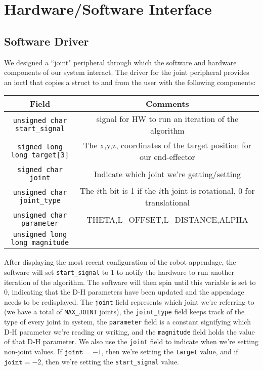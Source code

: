 \section{Hardware/Software Interface}

\subsection{Software Driver}

We designed a ``joint" peripheral through which the software and 
hardware components of our system interact. 
The driver for the joint peripheral provides an ioctl that copies a struct to and from the 
user with the following components:

\begin{center}
	\begin{tabular}{|c|c|}
		\hline
		Field & Comments \\
		\hline
		\texttt{unsigned char start\_signal} & signal for HW to run an iteration of the algorithm\\
		\hline
		\texttt{signed long long target[3]} &  The x,y,z, coordinates of the target position 
																						for our end-effector \\
		\hline
		\texttt{signed char joint} &  Indicate which joint we're getting/setting\\
		\hline
		\texttt{unsigned char joint\_type} & The $i$th bit is 1 if the $i$th joint is rotational, 
																					0 for translational \\
		\hline
		\texttt{unsigned char parameter} & THETA,L\_OFFSET,L\_DISTANCE,ALPHA \\
			\hline
		\texttt{unsigned long long magnitude} & ~\\
		\hline
	\end{tabular}
\end{center}
After displaying the most recent configuration of the robot appendage, the software will set
\texttt{start\_signal} to 1 to notify the hardware to run another iteration of the algorithm. The
software will then spin until this variable is set to 0, indicating that the D-H parameters have been
updated and the appendage needs to be redisplayed.
The \texttt{joint} field represents which joint we're referring to 
(we have a total of \texttt{MAX\_JOINT} joints), the \texttt{joint\_type}
field keeps track of the type of every joint in system, the \texttt{parameter} field
is a constant signifying which D-H parameter we're reading or writing, 
and the \texttt{magnitude} field holds the value of that D-H parameter.
We also use the \texttt{joint} field to indicate when we're setting non-joint values. If
$\texttt{joint} = -1$, then we're setting the \texttt{target} value, and if $\texttt{joint} = -2$,
then we're setting the \texttt{start\_signal} value.

